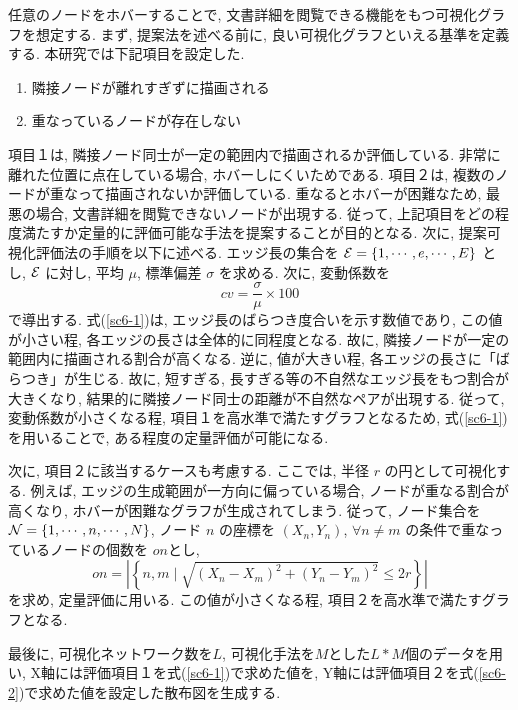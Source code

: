\documentclass[a4paper,12pt]{jsreport}
\begin{document}
任意のノードをホバーすることで, 文書詳細を閲覧できる機能をもつ可視化グラフを想定する.
まず, 提案法を述べる前に, 良い可視化グラフといえる基準を定義する.
本研究では下記項目を設定した.
\begin{enumerate}
    \item 隣接ノードが離れすぎずに描画される
    \item 重なっているノードが存在しない
\end{enumerate}
項目１は, 隣接ノード同士が一定の範囲内で描画されるか評価している.
非常に離れた位置に点在している場合, ホバーしにくいためである.
項目２は, 複数のノードが重なって描画されないか評価している.
重なるとホバーが困難なため, 最悪の場合, 文書詳細を閲覧できないノードが出現する.
従って, 上記項目をどの程度満たすか定量的に評価可能な手法を提案することが目的となる.
次に, 提案可視化評価法の手順を以下に述べる.
エッジ長の集合を ${\cal E} = \{1, \cdots, e, \cdots, E \}$ とし,
${\cal E}$ に対し, 平均 $\mu$, 標準偏差 $\sigma$ を求める.
次に, 変動係数を
\begin{equation}
  {cv} = \frac{\sigma}{\mu} \times 100
  \label{sc6-1}
\end{equation}
で導出する.
式(\ref{sc6-1})は, エッジ長のばらつき度合いを示す数値であり,
この値が小さい程, 各エッジの長さは全体的に同程度となる.
故に, 隣接ノードが一定の範囲内に描画される割合が高くなる.
逆に, 値が大きい程, 各エッジの長さに「ばらつき」が生じる.
故に, 短すぎる, 長すぎる等の不自然なエッジ長をもつ割合が大きくなり, 
結果的に隣接ノード同士の距離が不自然なペアが出現する.
従って, 変動係数が小さくなる程, 項目１を高水準で満たすグラフとなるため,
式(\ref{sc6-1})を用いることで, ある程度の定量評価が可能になる.

次に, 項目２に該当するケースも考慮する.
ここでは, 半径 $r$ の円として可視化する.
例えば, エッジの生成範囲が一方向に偏っている場合, 
ノードが重なる割合が高くなり, ホバーが困難なグラフが生成されてしまう.
従って, ノード集合を ${\cal N} = \{1, \cdots, n, \cdots, N \}$, 
ノード $n$ の座標を $(X_n, Y_n)$, $\forall n \neq m$ の条件で重なっているノードの個数を $on$とし,
\begin{equation}
  {on} = |\left\{ n, m \mid \sqrt{(X_n - X_m)^2 + (Y_n - Y_m)^2} \leq 2r \right\}|
  \label{sc6-2}
\end{equation}
を求め, 定量評価に用いる.
この値が小さくなる程, 項目２を高水準で満たすグラフとなる.

最後に, 可視化ネットワーク数を$L$, 可視化手法を$M$とした$L*M$個のデータを用い, 
X軸には評価項目１を式(\ref{sc6-1})で求めた値を,
Y軸には評価項目２を式(\ref{sc6-2})で求めた値を設定した散布図を生成する. 
\end{document}

